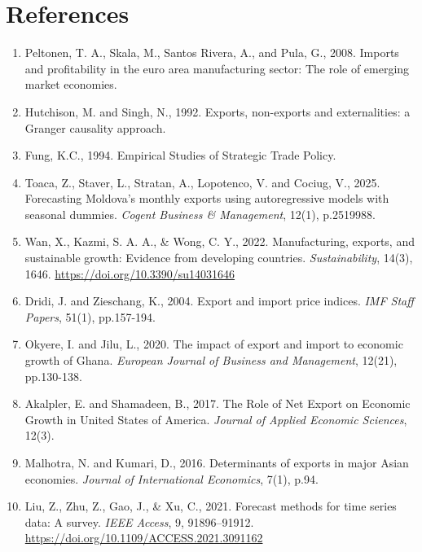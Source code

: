 \documentclass[12pt,a4paper]{report} %
\begin{document}
	\chapter*{References}
	\pagestyle{empty}
	\begin{enumerate}
		\item Peltonen, T. A., Skala, M., Santos Rivera, A., and Pula, G., 2008. Imports and
		profitability in the euro area manufacturing sector: The role of emerging market
		economies.
		
		\item Hutchison, M. and Singh, N., 1992. Exports, non-exports and externalities: a Granger
		causality approach.
		
		\item Fung, K.C., 1994. Empirical Studies of Strategic Trade Policy.
		
		\item Toaca, Z., Staver, L., Stratan, A., Lopotenco, V. and Cociug, V., 2025. Forecasting
		Moldova’s monthly exports using autoregressive models with seasonal dummies. \textit{Cogent
			Business \& Management}, 12(1), p.2519988.
		
		\item Wan, X., Kazmi, S. A. A., \& Wong, C. Y., 2022. Manufacturing, exports, and sustainable
		growth: Evidence from developing countries. \textit{Sustainability}, 14(3), 1646.
		\url{https://doi.org/10.3390/su14031646}
		
		\item Dridi, J. and Zieschang, K., 2004. Export and import price indices. \textit{IMF Staff
			Papers}, 51(1), pp.157-194.
		
		\item Okyere, I. and Jilu, L., 2020. The impact of export and import to economic growth of
		Ghana. \textit{European Journal of Business and Management}, 12(21), pp.130-138.
		
		\item Akalpler, E. and Shamadeen, B., 2017. The Role of Net Export on Economic Growth
		in United States of America. \textit{Journal of Applied Economic Sciences}, 12(3).
		
		\item Malhotra, N. and Kumari, D., 2016. Determinants of exports in major Asian
		economies. \textit{Journal of International Economics}, 7(1), p.94.
		
		\item Liu, Z., Zhu, Z., Gao, J., \& Xu, C., 2021. Forecast methods for time series data: A
		survey. \textit{IEEE Access}, 9, 91896–91912. \url{https://doi.org/10.1109/ACCESS.2021.3091162}
		

\end{enumerate}
\end{document}
